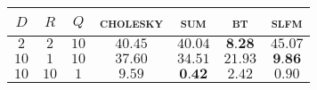 
\begin{tabular}{|ccc|cccc|}
  \hline
  \abovespace\belowspace
  $D$ & $R$ & $Q$ & \textsc{cholesky} & \textsc{sum} & \textsc{bt} & \textsc{slfm}\\
\hline
  \abovespace
 $ 2 $ & $ 2 $ & $ 10 $ & $ 40.45 $ & $ 40.04 $ & $ \textbf{8.28} $ & $ 45.07 $ \\ 
 $ 10 $ & $ 1 $ & $ 10 $ & $ 37.60 $ & $ 34.51 $ & $ 21.93 $ & $ \textbf{9.86} $ \\ 
 $ 10 $ & $ 10 $ & $ 1 $ & $ 9.59 $ & $ \textbf{0.42} $ & $ 2.42 $ & $ 0.90 $ 
  \belowspace \\

  \hline
\end{tabular}
